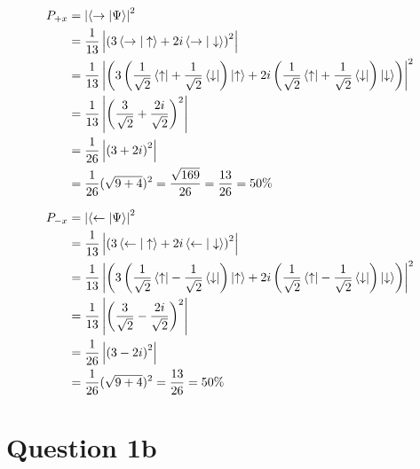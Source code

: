 \documentclass[12pt]{article}
\begin{document}
\begin{equation}
    \begin{split}
        P_{+x} &= \left|\braket{ \rightarrow | \Psi}\right|^{2} \\
        &= \frac{1}{13}\left|\left(3\braket{\rightarrow | \uparrow} + 2i\braket{\rightarrow | \downarrow}\right)^{2}\right| \\
        &= \frac{1}{13}\left|\left(3\left(\frac{1}{\sqrt{2}}\bra{\uparrow} + \frac{1}{\sqrt{2}}\bra{\downarrow}\right)\ket{\uparrow} + 2i\left(\frac{1}{\sqrt{2}}\bra{\uparrow} + \frac{1}{\sqrt{2}}\bra{\downarrow}\right)\ket{\downarrow}\right)\right|^2 \\
        &= \frac{1}{13}\left|\left(\frac{3}{\sqrt{2}} + \frac{2i}{\sqrt{2}}\right)^2\right| \\
        &= \frac{1}{26}\left|\left(3 + 2i\right)^2\right| \\
        &= \frac{1}{26}(\sqrt{9 + 4})^2  = \frac{\sqrt{169}}{26} = \frac{13}{26} = 50\% \\
    \end{split}
\end{equation}

\begin{equation}
    \begin{split}
        P_{-x} &= \left|\braket{ \leftarrow | \Psi}\right|^{2} \\
        &= \frac{1}{13}\left|\left(3\braket{\leftarrow | \uparrow} + 2i\braket{\leftarrow | \downarrow}\right)^{2}\right| \\
        &= \frac{1}{13}\left|\left(3\left(\frac{1}{\sqrt{2}}\bra{\uparrow} - \frac{1}{\sqrt{2}}\bra{\downarrow}\right)\ket{\uparrow} + 2i\left(\frac{1}{\sqrt{2}}\bra{\uparrow} - \frac{1}{\sqrt{2}}\bra{\downarrow}\right)\ket{\downarrow}\right)\right|^2 \\
        &= \frac{1}{13}\left|\left(\frac{3}{\sqrt{2}} - \frac{2i}{\sqrt{2}}\right)^2\right| \\
        &= \frac{1}{26}\left|\left(3 - 2i\right)^2\right| \\
        &= \frac{1}{26}(\sqrt{9 + 4})^2 = \frac{13}{26} = 50\% \\
    \end{split}
\end{equation}


\newpage
\section*{Question 1b}
\end{document}
